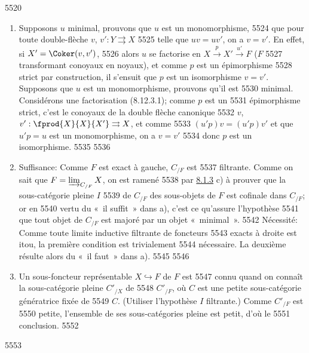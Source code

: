   5520	\begin{enumerate}
  5521	\renewcommand{\theenumi}{\alph{enumi}}
  5522	\renewcommand{\labelenumi}{\theenumi)}
  5523	\item Supposons $u$ minimal, prouvons que $u$ est un monomorphisme,
  5524	\ie que pour toute double-flèche $v$, $v':Y\rightrightarrows X$
  5525	telle que $uv=uv'$, on a $v=v'$. En effet, si $X'=\Coker(v,v')$,
  5526	alors $u$ se factorise en $X\xrightarrow{p}X'\xrightarrow{u'}F$ ($F$
  5527	transformant conoyaux en noyaux), et comme $p$ est un épimorphisme
  5528	strict par construction, il s'ensuit que $p$ est un isomorphisme 	$v=v'$. Supposons que $u$ est un monomorphisme, prouvons qu'il est
  5530	minimal. Considérons une factorisation (8.12.3.1); comme $p$ est un
  5531	épimorphisme strict, c'est le conoyaux de la double flèche canonique
  5532	$v$, $v':\fprod{X}{X}{X'}\rightrightarrows X$, et comme
  5533	$(u'p)v=(u'p)v'$ et que $u'p=u$ est un monomorphisme, on a $v=v'$
  5534	donc $p$ est un isomorphisme.
  5535	
  5536	\item Suffisance: Comme $F$ est exact à gauche, $C_{/F}$ est
  5537	filtrante. Comme on sait que $F=\varinjlim_{C_{/F}}X$, on est ramené
  5538	par \hyperref[I.prop8.1.3]{8.1.3} c) à prouver que la sous-catégorie pleine $I$
  5539	de $C_{/F}$ des sous-objets de $F$ est cofinale dans $C_{/F}$; or en
  5540	vertu du « il suffit » dans a), c'est ce qu'assure l'hypothèse
  5541	que tout objet de $C_{/F}$ est majoré par un objet « minimal ».
  5542	Nécessité: Comme toute limite inductive filtrante de foncteurs
  5543	exacts à droite est itou, la première condition est trivialement
  5544	nécessaire. La deuxième résulte alors du « il faut » dans a).
  5545	
  5546	\item Un sous-foncteur représentable $X\hookrightarrow F$ de $F$ est
  5547	connu quand on connaît la sous-catégorie pleine $C'_{/X}$ de
  5548	$C'_{/F}$, où $C$ est une petite sous-catégorie génératrice fixée de
  5549	$C$. (Utiliser l'hypothèse $I$ filtrante.) Comme $C'_{/F}$ est
  5550	petite, l'ensemble de ses sous-catégories pleine est petit, d'où le
  5551	conclusion.
  5552	\end{enumerate}
  5553	
